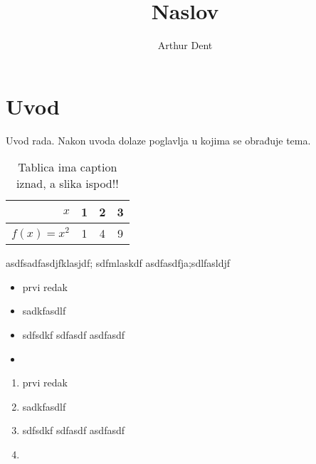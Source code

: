 \documentclass[times, utf8, zavrsni]{fer}
\begin{document}

\title{Naslov}

\author{Arthur Dent}

\maketitle

\izvornik

\zahvala{}

\tableofcontents

\chapter{Uvod}
Uvod rada. Nakon uvoda dolaze poglavlja u kojima se obrađuje tema.

\begin{table}[h!]
\caption{Tablica ima caption iznad, a slika ispod!!}
\label{tbl:kvadrati}
  \centering
  \begin{tabular}{r | c c c}
  $x$ & 1 & 2 & 3 \\ \hline
  $f(x) = x^2$ & 1 & 4 & 9
  \end{tabular}
\end{table}

asdfsadfasdjfklasjdf;
sdfmlaskdf
asdfasdfja;sdlfasldjf

\begin{itemize}
  \item prvi redak
  \item sadkfasdlf
  \item sdfsdkf
  sdfasdf
  asdfasdf
  \item
\end{itemize}

\begin{enumerate}
  \item prvi redak
  \item sadkfasdlf
  \item sdfsdkf
  sdfasdf
  asdfasdf
  \item
\end{enumerate}
\end{document}
